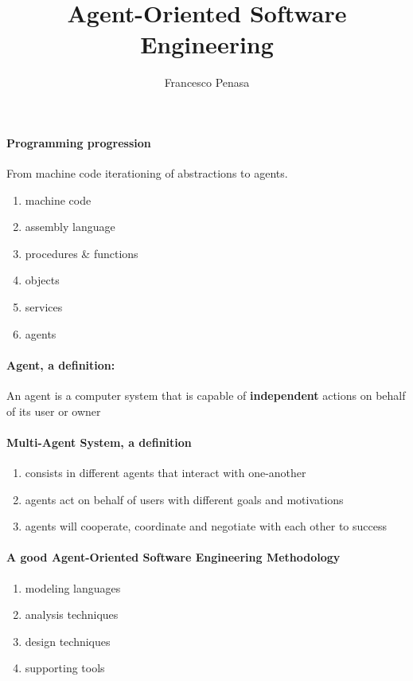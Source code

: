 \documentclass[11pt]{article}
\begin{document}
\author{Francesco Penasa}
\title{Agent-Oriented Software Engineering}
\maketitle

\medskip


\paragraph{Programming progression} %
\label{par:programming_progression}
From machine code iterationing of abstractions to agents. 
\begin{enumerate}
	\item machine code
	\item assembly language
	\item procedures \& functions
	\item objects
	\item services
	\item agents
\end{enumerate}

\paragraph{Agent, a definition:} %
\label{par:agent_a_definition_}
An agent is a computer system that is capable of \textbf{independent} actions on behalf of its user or owner

\paragraph{Multi-Agent System, a definition} %
\label{par:multi_agent_system_a_definition}
\begin{enumerate}
	\item consists in different agents that interact with one-another
	\item agents act on behalf of users with different goals and motivations
	\item agents will cooperate, coordinate and negotiate with each other to success
\end{enumerate}

\paragraph{A good Agent-Oriented Software Engineering Methodology} %
\label{par:a_good_agent_oriented_software_engineering_methodology}
\begin{enumerate}
	\item modeling languages
	\item analysis techniques
	\item design techniques
	\item supporting tools
\end{enumerate}
\end{document}
